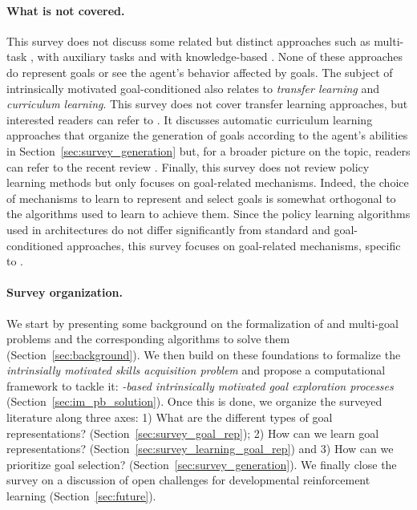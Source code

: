 \paragraph{What is not covered.} This survey does not discuss some related but distinct approaches such as multi-task \rl \cite{caruana1997multitask}, \rl with auxiliary tasks \cite{riedmiller2018learning,jaderberg2016reinforcement} and \rl with knowledge-based \ims \cite{bellemare2016unifying,pathak2017curiosity,burda2018exploration}. None of these approaches do represent goals or see the agent's behavior affected by goals. The subject of intrinsically motivated goal-conditioned \rl also relates to \textit{transfer learning} and \textit{curriculum learning}. This survey does not cover transfer learning approaches, but interested readers can refer to \cite{taylor2009transfer}. It  discusses automatic curriculum learning approaches that organize the generation of goals according to the agent's abilities in Section~\ref{sec:survey_generation} but, for a broader picture on the topic, readers can refer to the recent review \cite{portelas2020automatic}. Finally, this survey does not review policy learning methods but only focuses on goal-related mechanisms. Indeed, the choice of mechanisms to learn to represent and select goals is somewhat orthogonal to the algorithms used to learn to achieve them. Since the policy learning algorithms used in \rlimgep architectures do not differ significantly from standard \rl and goal-conditioned \rl approaches, this survey focuses on goal-related mechanisms, specific to \rlimgeps.

\paragraph{Survey organization.} We start by presenting some background on the formalization of \rl and multi-goal \rl problems and the corresponding algorithms to solve them (Section~\ref{sec:background}). We then build on these foundations to formalize the \textit{intrinsially motivated skills acquisition problem} and propose a computational framework to tackle it: \textit{\textsl{\rl}-based intrinsically motivated goal exploration processes} (Section~\ref{sec:im_pb_solution}). Once this is done, we organize the surveyed literature along three axes: 1) What are the different types of goal representations? (Section~\ref{sec:survey_goal_rep}); 2) How can we learn goal representations? (Section~\ref{sec:survey_learning_goal_rep}) and 3) How can we prioritize goal selection? (Section~\ref{sec:survey_generation}). We finally close the survey on a discussion of open challenges for developmental reinforcement learning (Section~\ref{sec:future}).


